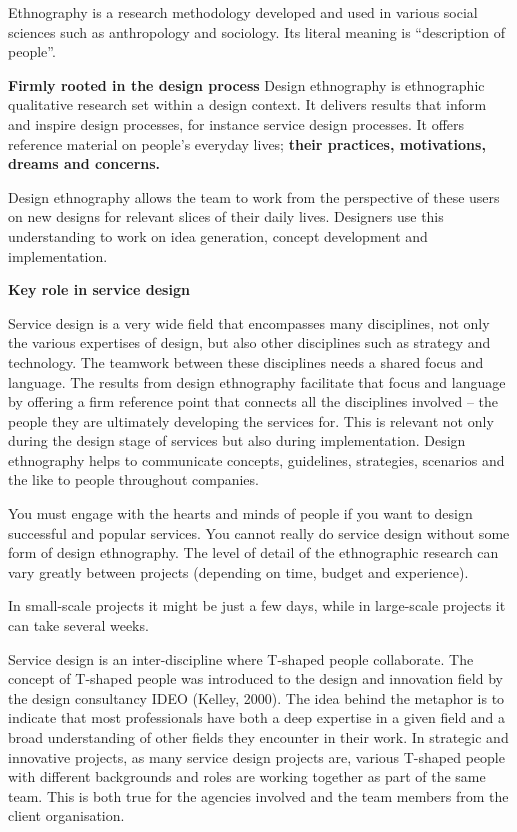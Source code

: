 Ethnography is a research methodology developed and used in various social sciences such as anthropology and sociology. Its literal meaning is “description of people”.

\textbf{Firmly rooted in the design process}
Design ethnography is ethnographic qualitative research set within a design context. It delivers results that inform and inspire design processes, for instance service design processes. It offers reference material on people’s everyday lives; \textbf{their practices, motivations, dreams and concerns.}

Design ethnography allows the team to work from the perspective of these users on new designs for relevant slices of their daily lives. Designers use this understanding to work on idea generation, concept development and implementation.

\textbf{Key role in service design}

Service design is a very wide field that encompasses many disciplines, not only the various expertises of design, but also other disciplines such as strategy and technology. The teamwork between these disciplines needs a shared focus and language. The results from design ethnography facilitate that focus and language by offering a firm reference point that connects all the disciplines involved – the people they are ultimately developing the services for. This is relevant not only during the design stage of services but also during implementation. Design ethnography helps to communicate concepts, guidelines, strategies, scenarios and the like to people throughout companies.


You must engage with the hearts and minds of people if you want to design successful and popular services. You cannot really do service design without some form of design ethnography. The level of detail of the ethnographic research can vary greatly between projects (depending on time, budget and experience).

In small-scale projects it might be just a few days, while in large-scale projects it can take several weeks.

Service design is an inter-discipline where T-shaped people collaborate. The concept of T-shaped people was introduced to the design and innovation field by the design consultancy IDEO (Kelley, 2000). The idea behind the metaphor is to indicate that most professionals have both a deep expertise in a given field and a broad understanding of other fields they encounter in their work. In strategic and innovative projects, as many service design projects are, various T-shaped people with different backgrounds and roles are working together as part of the same team. This is both true for the agencies involved and the team members from the client organisation.

